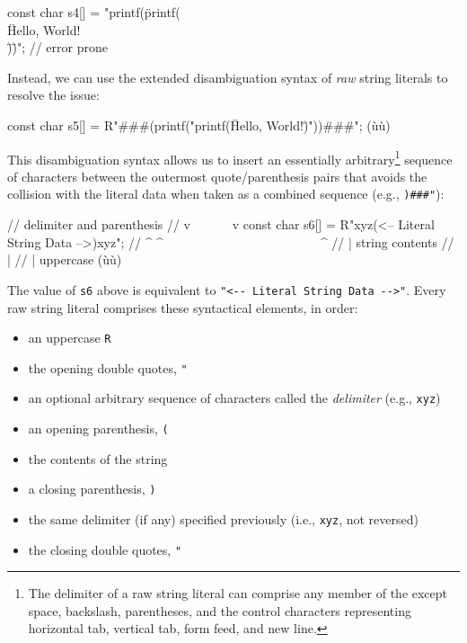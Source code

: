 \begin{emcppslisting}
const char s4[] = "printf(\"printf(\\\"Hello, World!\\\")\")";  // error prone
\end{emcppslisting}
    
\noindent Instead, we can use the extended disambiguation syntax of \emph{raw}
string literals to resolve the issue:

\begin{emcppslisting}
const char s5[] = R"###(printf("printf(\"Hello, World!\")"))###";  (ù{}ù)
\end{emcppslisting}

    
\noindent This disambiguation syntax allows us to insert an essentially
arbitrary{\cprotect\footnote{The delimiter of a raw string literal can
comprise any member of the  except
space, backslash, parentheses, and the control characters representing
  horizontal tab, vertical tab, form feed, and new line.}} sequence of
characters between the outermost quote/parenthesis pairs that avoids the
collision with the literal data when taken as a combined sequence (e.g.,
\lstinline!)###"!):

\begin{emcppslisting}
//                       delimiter and parenthesis
//                  v~~~                           ~~~v
const char s6[] = R"xyz(<-- Literal String Data -->)xyz";
//                ^     ^~~~~~~~~~~~~~~~~~~~~~~~~~^
//                |          string contents
//                |
//                | uppercase (ù{}ù)
\end{emcppslisting}
    
\noindent The value of \lstinline!s6! above is equivalent to
\lstinline!"<--!~\lstinline!Literal!~\lstinline!String!~\lstinline!Data!~\lstinline!-->"!.
Every raw string literal comprises these syntactical elements, in order:
\begin{itemize}
\item{an uppercase \lstinline!R!}
\item{the opening double quotes, \lstinline!"!} 
\item{an optional arbitrary sequence of characters called the \emph{delimiter} (e.g., \lstinline!xyz!)}
\item{an opening parenthesis, \lstinline!(!}
\item{the contents of the string}
\item{a closing parenthesis, \lstinline!)!}
\item{the same delimiter (if any) specified previously (i.e., \lstinline!xyz!, not reversed)} 
\item{the closing double quotes, \lstinline!"!}
\end{itemize}


